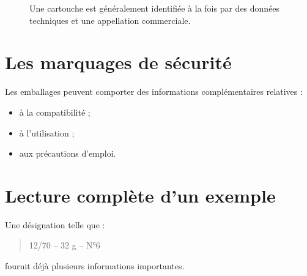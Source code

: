 \begin{figure}[htbp]
\centering


\caption{Une cartouche est généralement identifiée à la fois par des données techniques et une appellation commerciale.}
\label{fig:technique_commercial}

\end{figure}

\section{Les marquages de sécurité}

Les emballages peuvent comporter des informations complémentaires relatives :

\begin{itemize}
    \item à la compatibilité ;
    \item à l'utilisation ;
    \item aux précautions d'emploi.
\end{itemize}

\section{Lecture complète d'un exemple}

Une désignation telle que :

\begin{quote}
12/70 -- 32 g -- N°6
\end{quote}

fournit déjà plusieurs informations importantes.

